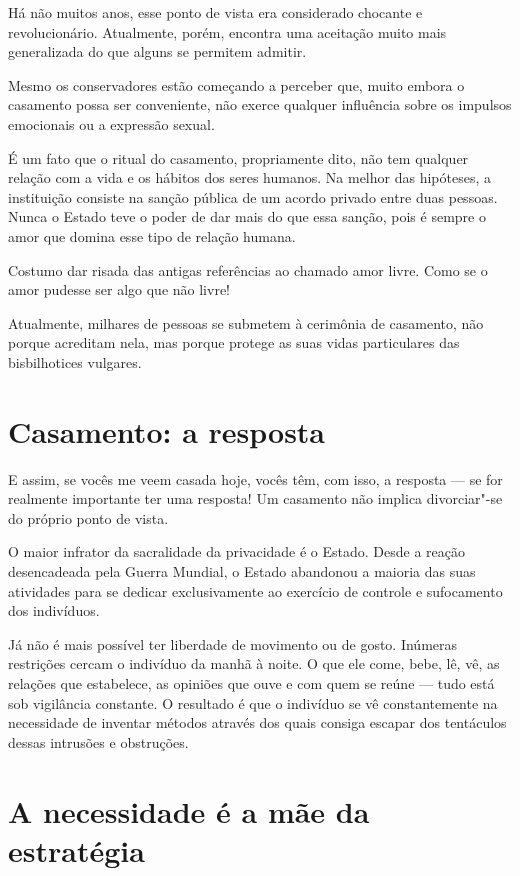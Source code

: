 Há não muitos anos, esse ponto de vista era considerado chocante e
revolucionário. Atualmente, porém, encontra uma aceitação muito mais
generalizada do que alguns se permitem admitir.

Mesmo os conservadores estão começando a perceber que, muito embora o
casamento possa ser conveniente, não exerce qualquer influência sobre os
impulsos emocionais ou a expressão sexual.

É um fato que o ritual do casamento, propriamente dito, não tem qualquer
relação com a vida e os hábitos dos seres humanos. Na melhor das
hipóteses, a instituição consiste na sanção pública de um acordo privado
entre duas pessoas. Nunca o Estado teve o poder de dar mais do que essa
sanção, pois é sempre o amor que domina esse tipo de relação humana.

Costumo dar risada das antigas referências ao chamado amor livre. Como
se o amor pudesse ser algo que não livre!

Atualmente, milhares de pessoas se submetem à cerimônia de casamento,
não porque acreditam nela, mas porque protege as suas vidas particulares
das bisbilhotices vulgares.

\section{Casamento: a resposta}

E assim, se vocês me veem casada hoje, vocês têm, com isso, a resposta --- se
for realmente importante ter uma resposta! Um casamento não implica
divorciar"-se do próprio ponto de vista.

O maior infrator da sacralidade da privacidade é o Estado. Desde a
reação desencadeada pela Guerra Mundial, o Estado abandonou a maioria
das suas atividades para se dedicar exclusivamente ao exercício de
controle e sufocamento dos indivíduos.

Já não é mais possível ter liberdade de movimento ou de gosto. Inúmeras
restrições cercam o indivíduo da manhã à noite. O que ele come, bebe,
lê, vê, as relações que estabelece, as opiniões que ouve e com quem
se reúne --- tudo está sob vigilância constante. O resultado é que o
indivíduo se vê constantemente na necessidade de inventar métodos
através dos quais consiga escapar dos tentáculos dessas intrusões e
obstruções.

\section{A necessidade é a mãe da estratégia}

